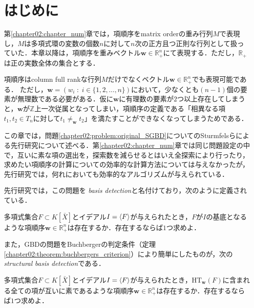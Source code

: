 \section{はじめに}
第\ref{chapter02:chapter_num}章では，項順序をmatrix orderの重み行列$M$で表現し，$M$は多項式環の変数の個数$n$に対して$n$次の正方且つ正則な行列として扱っていた．本章以降は，項順序を重みベクトル$\bm{w}\in \mathbb{R}^n_{+}$にて表現する．ただし，$\mathbb{R}_{+}$は正の実数全体の集合とする．
\begin{remark*}[ベクトルで表現された項順序について]
	項順序はcolumn full rankな行列$M$だけでなくベクトル$\bm{w}\in \mathbb{R}^n_{+}$でも表現可能である．
	ただし，$\bm{w} = (w_i\;:\; i\in \{1, 2, \dots, n\})$において，少なくとも$(n-1)$個の要素が無理数である必要がある．仮に$\bm{w}$に有理数の要素が$2$つ以上存在してしまうと，$\bm{w}$が$\mathbb{Z}$上一次従属となってしまい，項順序の定義である「相異なる項$t_1, t_2 \in T_n$に対して$t_1 \ne_{\bm{w}} t_2$」を満たすことができなくなってしまうためである．
\end{remark*}
\par
この章では，問題\ref{chapter02:problem:original_SGBD}についてのSturmfelsらによる先行研究について述べる．第\ref{chapter02:chapter_num}章では同じ問題設定の中で，互いに素な項の選出を，探索数を減らせるとはいえ全探索により行ったり，求めたい項順序の計算についての効率的な計算方法については与えなかったが，先行研究では，何れにおいても効率的なアルゴリズムが与えられている．
\par
先行研究では，この問題を\emph{\groebner{} basis detection}と名付けており，次のように定義されている．
\begin{definition}
	多項式集合$F \subset K[\bar{X}]$とイデアル$I = \langle F \rangle$が与えられたとき，$F$が$I$の\groebner{}基底となるような項順序$\bm{w} \in \mathbb{R}^n_{+}$は存在するか．存在するならば$1$つ求めよ．
\end{definition}
また，GBDの問題をBuchbergerの判定条件（定理\ref{chapter02:theorem:buchbergers_criterion}）により簡単にしたものが，次の\emph{structural \groebner{} basis detection}である．
\begin{definition}
	多項式集合$F \subset K[\bar{X}]$とイデアル$I = \langle F \rangle$が与えられたとき，$\mathrm{HT}_{\bm{w}}(F)$に含まれる全ての項が互いに素であるような項順序$\bm{w} \in \mathbb{R}^n_{+}$は存在するか．存在するならば$1$つ求めよ．
\end{definition}











